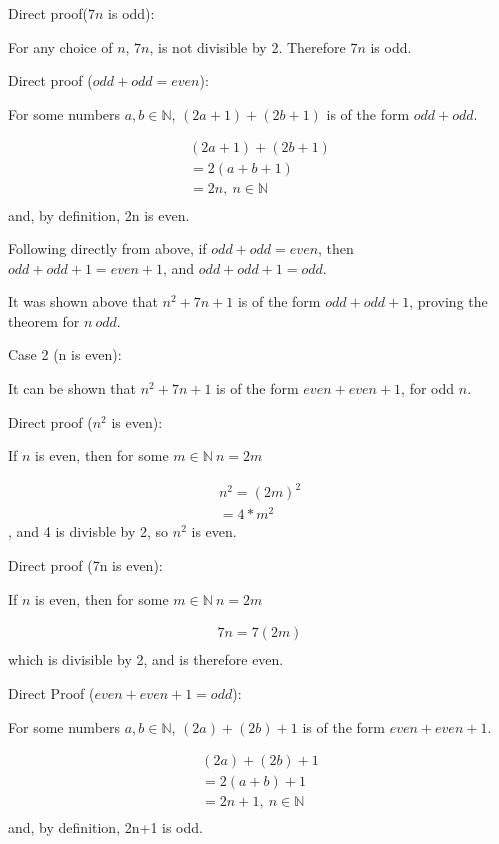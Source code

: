 \documentclass[11pt,letterpaper]{article}
\begin{document}
\begin{enumerate}
Direct proof($7n$ is odd):

For any choice of $n$, $7n$, is not divisible by 2. Therefore $7n$ is odd. 
 
Direct proof ($odd + odd = even$):

For some numbers $a, b \in \mathbb{N}$, $(2a + 1) + (2b +1)$ is of the form $odd + odd$.

\begin{eqnarray}
(2a+1) + (2b+1) \\
= 2(a+b+1)  \\
= 2n, \: n \in \mathbb{N} \\
\end{eqnarray}
and, by definition, 2n is even.

Following directly from above, if $odd + odd = even$, then $odd + odd + 1 = even + 1$, and $odd + odd + 1 = odd$.

It was shown above that $n^2 + 7n + 1$ is of the form $odd + odd + 1$, proving the theorem for $n \: odd$.

Case 2 (n is even):

It can be shown that $n^2 + 7n + 1$ is of the form $even + even + 1$, for odd $n$.

Direct proof ($n^2$ is even):

If $n$ is even, then for some $m \in \mathbb{N} \: n = 2m$ 

\begin{eqnarray}
n^2 = (2m)^2 \\
= 4 * m^2
\end{eqnarray}
, and 4 is divisble by 2, so $n^2$ is even.

Direct proof (7n is even):

If $n$ is even, then for some $m \in \mathbb{N} \: n = 2m$ 

\begin{eqnarray}
7n = 7(2m) \\
\end{eqnarray}
which is divisible by 2, and is therefore even.

Direct Proof ($even + even + 1 = odd$):

For some numbers $a, b \in \mathbb{N}$, $(2a) + (2b) + 1 $ is of the form $even + even + 1$.

\begin{eqnarray}
(2a) + (2b) +1 \\
= 2(a+b) +1  \\
= 2n + 1, \: n \in \mathbb{N} \\
\end{eqnarray}
and, by definition, 2n+1 is odd.


\end{enumerate}
\end{document}
